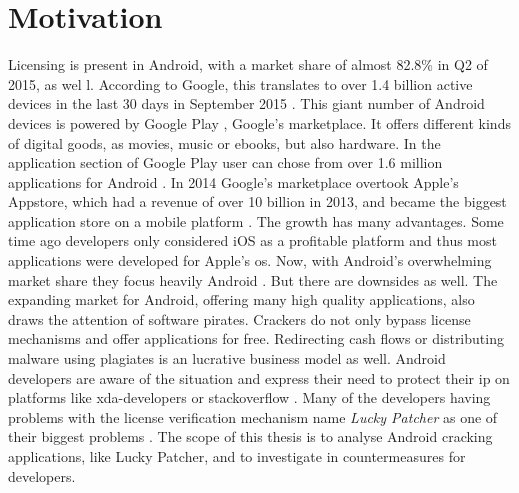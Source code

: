 \section{Motivation}\label{subsection:introduction-motivation}
Licensing is present in Android, with a market share of almost 82.8\% in Q2 of 2015,  as wel \cite{androidShare}l.
According to Google, this translates to over 1.4 billion active devices in the last 30 days in September 2015 \cite{androidDevices}.
This giant number of Android devices is powered by Google Play \cite{googlePlay}, Google's marketplace.
It offers different kinds of digital goods, as movies, music or ebooks, but also hardware.
In the application section of Google Play user can chose from over 1.6 million applications for Android \cite{statistaAppStore}.
In 2014 Google's marketplace overtook Apple's Appstore, which had a revenue of over 10 billion in 2013, and became the biggest application store on a mobile platform \cite{wiwoValue}.
\newline
The growth has many advantages.
Some time ago developers only considered iOS as a profitable platform and thus most applications were developed for Apple's \gls{os}.
Now, with Android's overwhelming market share they focus heavily Android \cite{businessProfit}.
But there are downsides as well.
The expanding market for Android, offering many high quality applications, also draws the attention of software pirates.
Crackers do not only bypass license mechanisms and offer applications for free.
Redirecting cash flows or distributing malware using plagiates is an lucrative business model as well.
Android developers are aware of the situation \cite{developersPiracy} and express their need to protect their \gls{ip} on platforms like xda-developers \cite{xdaPiracy} or stackoverflow \cite{stackoverflowPiracy}.
Many of the developers having problems with the license verification mechanism name \textit{Lucky Patcher} as one of their biggest problems \cite{stackoverflowLucky}.
\newline
\newline
The scope of this thesis is to analyse Android cracking applications, like Lucky Patcher,  and to investigate in countermeasures for developers.
